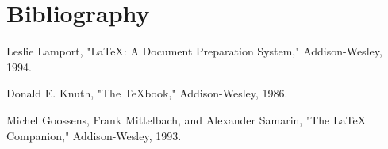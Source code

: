 \documentclass{article}
\begin{document}
\section{Bibliography}

\begin{thebibliography}{X}

 Leslie Lamport, "LaTeX: A Document Preparation System," Addison-Wesley, 1994.

 Donald E. Knuth, "The TeXbook," Addison-Wesley, 1986.

 Michel Goossens, Frank Mittelbach, and Alexander Samarin, "The LaTeX Companion," Addison-Wesley, 1993.

\end{thebibliography}
\end{document}
